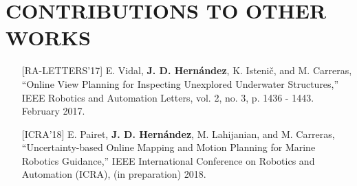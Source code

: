 \section*{CONTRIBUTIONS TO OTHER WORKS}

\begin{itemize}
  \item[] [RA-LETTERS'17] E. Vidal, \textbf{J. D. Hern\'andez}, K. Isteni\v{c},
  and M. Carreras, ``Online View Planning for Inspecting Unexplored Underwater
  Structures,'' IEEE Robotics and Automation Letters, vol. 2, no. 3, p. 1436 -
  1443. February 2017.
  \item[] [ICRA'18] E. Pairet, \textbf{J. D. Hern\'andez}, M. Lahijanian, and M.
  Carreras, ``Uncertainty-based Online Mapping and Motion Planning for Marine
  Robotics Guidance,'' IEEE International Conference on Robotics and Automation
  (ICRA), (in preparation) 2018.
\end{itemize}